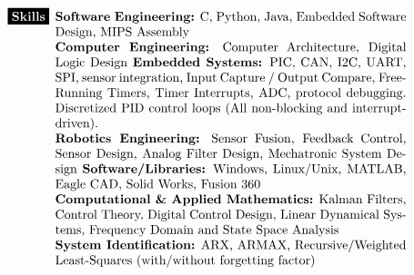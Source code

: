 \documentclass[paper=a4,fontsize=10pt]{article} %
\def \mainColWidth {0.8\textwidth}		%
\def \leftColWidth {0.05\textwidth}		%
\begin{document}
\begin{align*}
	&
	\begin{array}[t]{l} 
	\parbox[t]{\leftColWidth}{%
		\colorbox{black}{\color{white}{\textbf{Skills}}}
	}%
	\end{array}
	&
	\begin{array}[t]{l}
	\parbox[t]{\mainColWidth}{%
		\textbf{Software Engineering:} C, Python, Java, Embedded Software Design, MIPS Assembly\\
		\textbf{Computer Engineering:} Computer Architecture, Digital Logic Design
		\textbf{Embedded Systems:} PIC, CAN, I2C, UART, SPI, sensor integration, Input Capture / Output Compare, Free-Running Timers, Timer Interrupts, ADC, protocol debugging. Discretized PID control loops (All non-blocking and interrupt-driven).\\
		\textbf{Robotics Engineering:} Sensor Fusion, Feedback Control, Sensor Design, Analog Filter Design, Mechatronic System Design
		\textbf{Software/Libraries:} Windows, Linux/Unix, MATLAB, Eagle CAD, Solid Works, Fusion 360\\
		\textbf{Computational \& Applied Mathematics:} Kalman Filters, Control Theory, Digital Control Design, Linear Dynamical Systems, Frequency Domain and State Space Analysis\\
		\textbf{System Identification:} ARX, ARMAX, Recursive/Weighted Least-Squares (with/without forgetting factor)
	}%
	\end{array}\\
	&\\
\end{align*}
\end{document}
